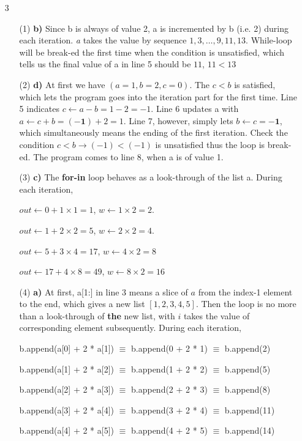\documentclass[11pt]{amsart}
\begin{document}
\begin{itemize}
\item [3]
\begin{itemize}
\item [(1)] \textbf{b)} Since b is always of value 2, a is incremented by b (i.e. 2) during each iteration. \textit{a} takes the value by sequence $1,3,\hdots,9,11,13$. While-loop will be break-ed the first time when the condition is unsatisfied, which tells us the final value of a in line 5 should be $11$, \textbf{$11 < 13$}
\item [(2)] \textbf{d)} At first we have $(a = 1, b = 2, c = 0)$. The $c < b$ is satisfied, which lets the program goes into the iteration part for the first time. Line 5 indicates $c \gets a - b = 1 - 2 = - 1$. Line 6 updates a with $a \gets c + b = \mathbf{(-1)} + 2 = 1$. Line 7, however, simply lets $b \gets c = \mathbf{-1}$, which simultaneously means the ending of the first iteration. Check the condition $c < b \to (-1) < (-1)$ is unsatisfied thus the loop is break-ed. The program comes to line 8, when a is of value 1.
\item [(3)] \textbf{c)} The \textbf{for-in} loop behaves as a look-through of the list a. 
During each iteration,

 $out \gets 0 + 1 \times 1 = 1$, $w \gets 1 \times 2 = 2$. 
 
 $out \gets 1 + 2 \times 2 = 5$, $w \gets 2 \times 2 = 4$. 
 
 $out \gets 5 + 3 \times 4 = 17$, $w \gets 4 \times 2 = 8$
 
 $out \gets 17 + 4 \times 8 = 49$, $w \gets 8 \times 2 = 16$
 
 \item[(4)] \textbf{a)} At first, a[1:] in line 3 means a slice of $a$ from the index-1 element to the end, which gives a new list $[1,2,3,4,5]$. Then the loop is no more than a look-through of \textbf{the} new list, with $i$ takes the value of corresponding element subsequently.
 During each iteration, 
 
b.append(a[0] + 2 * a[1]) $\equiv$ b.append(0 + 2 * 1)   $\equiv$ b.append(2)

b.append(a[1] + 2 * a[2]) $\equiv$ b.append(1 + 2 * 2)   $\equiv$ b.append(5)

b.append(a[2] + 2 * a[3]) $\equiv$ b.append(2 + 2 * 3)   $\equiv$ b.append(8)

b.append(a[3] + 2 * a[4]) $\equiv$ b.append(3 + 2 * 4)   $\equiv$ b.append(11)

b.append(a[4] + 2 * a[5]) $\equiv$ b.append(4 + 2 * 5)   $\equiv$ b.append(14)



\end{itemize}
\end{itemize}
\end{document}
